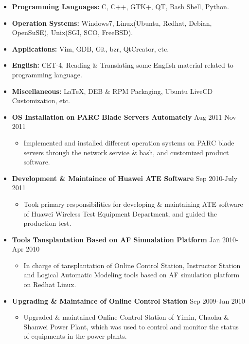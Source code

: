 \documentclass[a4paper, 10pt, titlepage]{article}
\begin{document}
\begin{itemize}
\item \textbf{Programming Languages:} C, C++, GTK+, QT, Bash Shell, Python.
\item \textbf{Operation Systems:} Windows7, Linux(Ubuntu, Redhat, Debian, OpenSuSE), Unix(SGI, SCO, FreeBSD).
\item \textbf{Applications:} Vim, GDB, Git, bzr, QtCreator, etc.
\item \textbf{English:} CET-4, Reading \& Translating some English material related to programming language.
\item \textbf{Miscellaneous:} {\LaTeX}, DEB \& RPM Packaging, Ubuntu LiveCD Customization, etc.
\end{itemize}

\begin{itemize}

\item \textbf{OS Installation on PARC Blade Servers Automately} \hfill \textrm{Aug 2011-Nov 2011}
  \begin{itemize}
  \item Implemented and installed different operation systems on PARC blade servers through the network service \& bash, and customized product software.
  \end{itemize}

\item \textbf{Development \& Maintaince of Huawei ATE Software} \hfill \textrm{Sep 2010-July 2011}
   \begin{itemize}
   \item Took primary responsibilities for developing \& maintaining ATE software of Huawei Wireless Test Equipment Department, and guided the production test.
   \end{itemize}

\item \textbf{Tools Tansplantation Based on AF Simualation Platform} \hfill \textrm{Jan 2010-Apr 2010}
   \begin{itemize}
   \item In charge of tansplantation of Online Control Station, Instructor Station and Logical Automatic Modeling tools based on AF simulation platform on Redhat Linux.
   \end{itemize}

\item \textbf{Upgrading \& Maintaince of Online Control Station} \hfill \textrm{Sep 2009-Jan 2010}
  \begin{itemize}
  \item Upgraded \& maintained Online Control Station of Yimin, Chaohu \& Shanwei Power Plant, which was used to control and monitor the status of  equipments in the power plants.
  \end{itemize}


\end{itemize}
\end{document}
